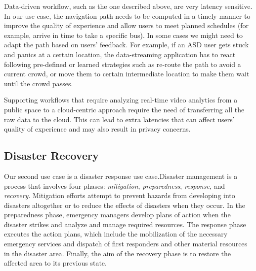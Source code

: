 Data-driven workflow, such as the one described above, are very latency sensitive. In our use case, the navigation path needs to be computed in a timely manner to improve the quality of experience and allow users to meet planned schedules (for example, arrive in time to take a specific bus). In some cases we might need to adapt the path based on users' feedback. For example, if an ASD user gets stuck and panics at a certain location, the data-streaming application has to react following pre-defined or learned strategies such as re-route the path to avoid a current crowd, or move them to certain intermediate location to make them wait until the crowd passes. 

Supporting workflows that require analyzing real-time video analytics from a public space to a cloud-centric approach require the need of transferring all the raw data to the cloud. This can lead to extra latencies that can affect users' quality of experience and may also result in privacy concerns.


\subsection{Disaster Recovery}

Our second use case is a disaster response use case.Disaster management is a process that involves four phases: \textit{mitigation}, \textit{preparedness}, \textit{response}, and \textit{recovery}. Mitigation efforts attempt to prevent hazards from developing into disasters altogether or to reduce the effects of disasters when they occur. In the preparedness phase, emergency managers develop plans of action when the disaster strikes and analyze and manage required resources. The response phase executes the action plans, which include the mobilization of the necessary emergency services and dispatch of first responders and other material resources in the disaster area. Finally, the aim of the recovery phase is to restore the affected area to its previous state.

